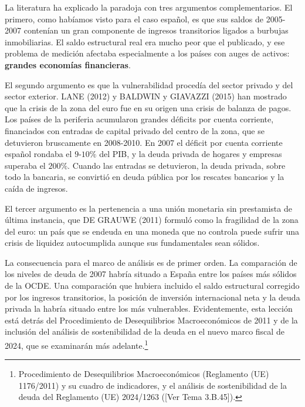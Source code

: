 \documentclass[10pt,a4paper]{article}
\newcommand{\authorfont}[1]{{\fontfamily{EBGaramond-TLF}\selectfont #1}}
\begin{document}
La literatura ha explicado la paradoja con tres argumentos complementarios. El primero, como habíamos visto para el caso español, es que sus saldos de 2005-2007 contenían un gran componente de ingresos transitorios ligados a burbujas inmobiliarias. El saldo estructural real era mucho peor que el publicado, y ese problema de medición afectaba especialmente a los países con auges de activos: \textbf{grandes economías financieras}.

El segundo argumento es que la vulnerabilidad procedía del sector privado y del sector exterior. LANE (2012) y BALDWIN y GIAVAZZI (2015) han mostrado que la crisis de la zona del euro fue en su origen una crisis de balanza de pagos. Los países de la periferia acumularon grandes déficits por cuenta corriente, financiados con entradas de capital privado del centro de la zona, que se detuvieron bruscamente en 2008-2010. En 2007 el déficit por cuenta corriente español rondaba el $9$-$10\%$ del PIB, y la deuda privada de hogares y empresas superaba el $200\%$. Cuando las entradas se detuvieron, la deuda privada, sobre todo la bancaria, se convirtió en deuda pública por los rescates bancarios y la caída de ingresos.

El tercer argumento es la pertenencia a una unión monetaria sin prestamista de última instancia, que DE GRAUWE (2011) formuló como la fragilidad de la zona del euro: un país que se endeuda en una moneda que no controla puede sufrir una crisis de liquidez autocumplida aunque sus fundamentales sean sólidos.

La consecuencia para el marco de análisis es de primer orden. La comparación de los niveles de deuda de 2007 habría situado a España entre los países más sólidos de la OCDE. Una comparación que hubiera incluido el saldo estructural corregido por los ingresos transitorios, la posición de inversión internacional neta y la deuda privada la habría situado entre los más vulnerables. Evidentemente, esta lección está detrás del Procedimiento de Desequilibrios Macroeconómicos de 2011 y de la inclusión del análisis de sostenibilidad de la deuda en el nuevo marco fiscal de 2024, que se examinarán más adelante.\footnote{%
    Procedimiento de Desequilibrios Macroeconómicos (Reglamento (UE) 1176/2011) y su cuadro de indicadores, y el análisis de sostenibilidad de la deuda del Reglamento (UE) 2024/1263 ([\authorfont{Ver Tema 3.B.45}]).
}
\end{document}
